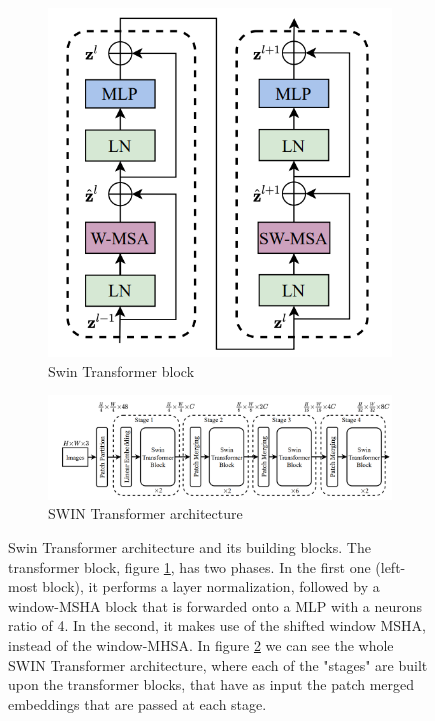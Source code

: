 \begin{figure}[htbp]
	\centering
	\begin{subfigure}{0.28\textwidth}
		\centering
		\includegraphics[width=\textwidth]{figures/swin_blocks}
		\caption{Swin Transformer block}
		\label{fig:swinblocks}
	\end{subfigure}
	\begin{subfigure}{0.7\textwidth}
		\centering
		\includegraphics[width=\textwidth]{figures/swin_architecture}
		\caption{SWIN Transformer architecture}
		\label{fig:swinarchitecture}
	\end{subfigure}
	\caption{Swin Transformer architecture and its building blocks. The transformer block, figure \ref{fig:swinblocks}, has two phases. In the first one (left-most block), it performs a layer normalization, followed by a window-MSHA block that is forwarded onto a MLP with a neurons ratio of 4. In the second, it makes use of the shifted window MSHA, instead of the window-MHSA. In figure \ref{fig:swinarchitecture} we can see the whole SWIN Transformer architecture, where each of the "stages" are built upon the transformer blocks, that have as input the patch merged embeddings that are passed at each stage.}
	\label{fig:swin_transformer_parts}
\end{figure}

